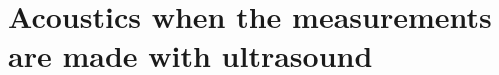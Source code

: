 \documentclass[10pt, fleqn,final,showtrims,oldfontcommands, article,a4paper,oneside]{memoir} %
\newcommand{\Poincare}{Poincar{\'e}\xspace}
\begin{document}











\section{Acoustics when the measurements are made with ultrasound}\label{sec:Maxwell}
\end{document}
